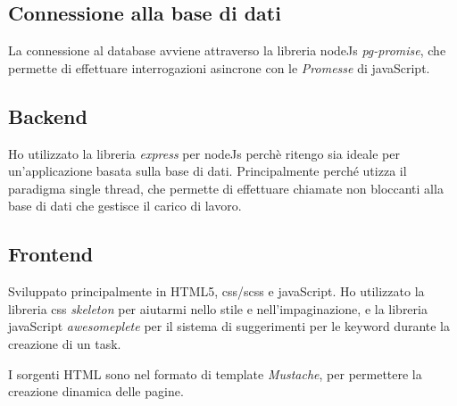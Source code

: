 \documentclass[a4paper]{article}
\begin{document}
\subsection{Connessione alla base di dati}
La connessione al database avviene attraverso la libreria nodeJs \emph{pg-promise}, che permette di effettuare interrogazioni asincrone con le \emph{Promesse} di javaScript.

\subsection{Backend}
Ho utilizzato la libreria \emph{express} per nodeJs perch\`e ritengo sia ideale per un'applicazione basata sulla base di dati. Principalmente perch\'e utizza il paradigma single thread, che permette di effettuare chiamate non bloccanti alla base di dati che gestisce il carico di lavoro.

\subsection{Frontend}
Sviluppato principalmente in HTML5, css\slash scss e javaScript.
Ho utilizzato la libreria css \emph{skeleton} per aiutarmi nello stile e nell'impaginazione, e la libreria javaScript \emph{awesomeplete} per il sistema di suggerimenti per le keyword durante la creazione di un task.

I sorgenti HTML sono nel formato di template \emph{Mustache},
per permettere la creazione dinamica delle pagine.
\end{document}
